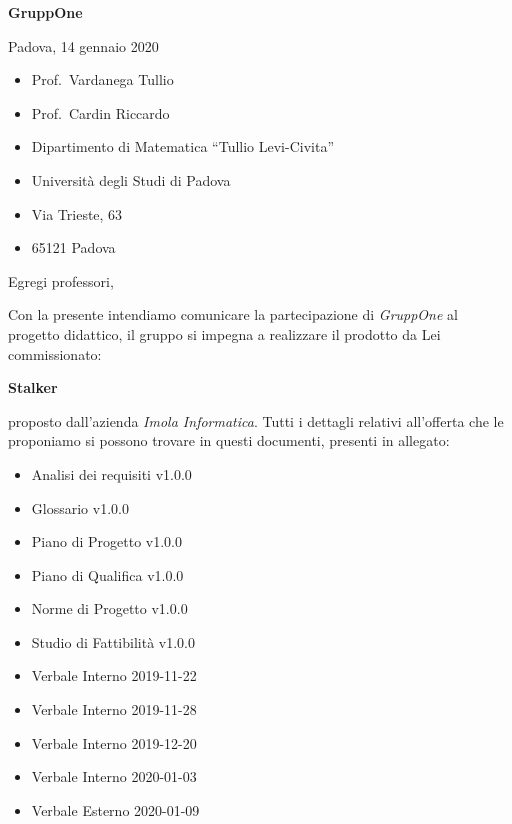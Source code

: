 \documentclass{article}
\begin{document}
\begin{center}
  {\LARGE \textbf{GruppOne}}
\end{center}

\begin{multicols}{2}
  Padova, 14 gennaio 2020
  \columnbreak{}
  \begin{itemize}
    \setlength{\itemsep}{0mm}
    \setlength{\parskip}{0mm}
    \renewcommand{\labelitemi}{}
    \item Prof.\ Vardanega Tullio
    \item Prof.\ Cardin Riccardo
    \item Dipartimento di Matematica ``Tullio Levi-Civita''
    \item Università degli Studi di Padova
    \item Via Trieste, 63
    \item 65121 Padova
  \end{itemize}
\end{multicols}
Egregi professori,

Con la presente intendiamo comunicare la partecipazione di \textit{GruppOne} al progetto didattico, il gruppo si impegna a realizzare il prodotto da Lei commissionato:
\begin{center}
  \textbf{Stalker} 
\end{center}
proposto dall'azienda \textit{Imola Informatica}.
Tutti i dettagli relativi all'offerta che le proponiamo si possono trovare in questi documenti, presenti in allegato:
\begin{itemize}
  \item Analisi dei requisiti v1.0.0
  \item Glossario v1.0.0
  \item Piano di Progetto v1.0.0
  \item Piano di Qualifica v1.0.0
  \item Norme di Progetto v1.0.0
  \item Studio di Fattibilità v1.0.0
  \item Verbale Interno 2019-11-22
  \item Verbale Interno 2019-11-28
  \item Verbale Interno 2019-12-20
  \item Verbale Interno 2020-01-03
  \item Verbale Esterno 2020-01-09
\end{itemize}
\end{document}

